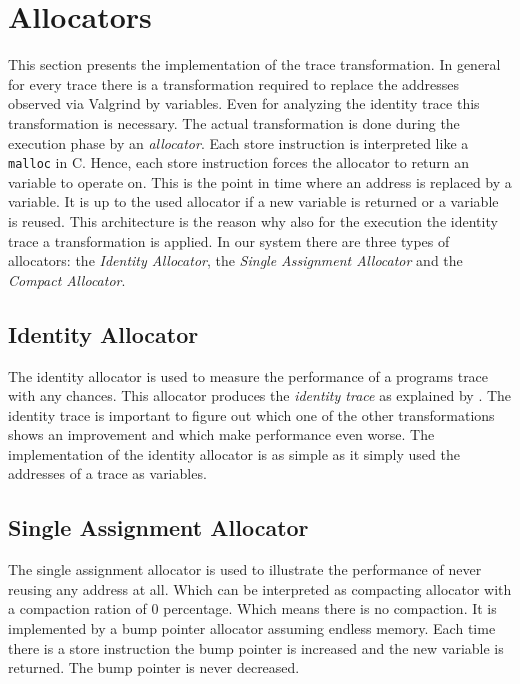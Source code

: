 \documentclass[onecolumn, openright, master, english, signatures]{dbrgrptt}
\begin{document}

\section{Allocators}
\label{sec:allocators}

This section presents the implementation of the trace transformation. In general for every trace there is a transformation required to replace the addresses observed via Valgrind by variables. Even for analyzing the identity \ac{trace} this transformation is necessary. The actual transformation is done during the execution phase by an \emph{allocator}. Each store instruction is interpreted like a \texttt{malloc} in C. Hence, each store instruction forces the allocator to return an variable to operate on. This is the point in time where an address is replaced by a variable.  It is up to the used allocator if a new variable is returned or a variable is reused. This architecture is the reason why also for the execution the identity \ac{trace} a transformation is applied. In our system there are three types of allocators: the \emph{Identity Allocator}, the \emph{Single Assignment Allocator} and the \emph{Compact Allocator}.

\subsection{Identity Allocator}\label{ssec:allocator-original}

The identity allocator is used to measure the performance of a programs \ac{trace} with any chances. This allocator produces the \emph{identity \ac{trace}} as explained by . The identity \ac{trace} is important to figure out which one of the other transformations shows an improvement and which make performance even worse. The implementation of the identity allocator is as simple as it simply used the addresses of a \ac{trace} as variables.

\subsection{Single Assignment Allocator}\label{ssec:allocator-single-assignment}

The single assignment allocator is used to illustrate the performance of never reusing any address at all. Which can be interpreted as compacting allocator with a compaction ration of 0 percentage. Which means there is no compaction. It is implemented by a bump pointer allocator assuming endless memory. Each time there is a store instruction the bump pointer is increased and the new variable is returned. The bump pointer is never decreased.
\end{document}
